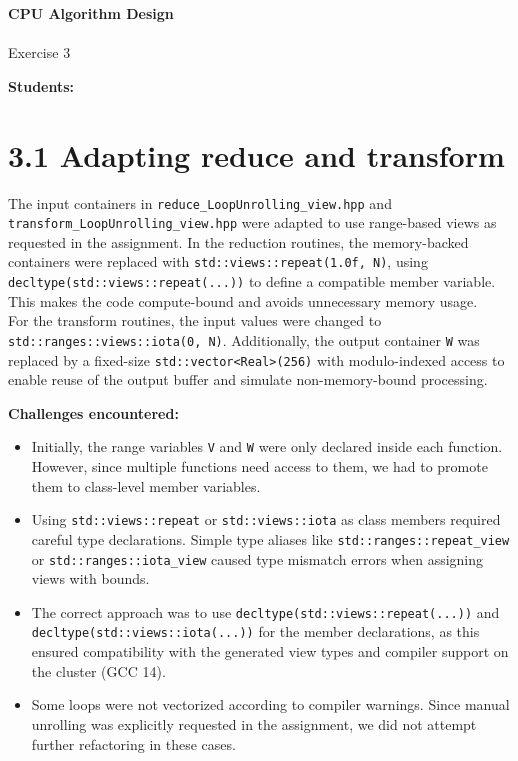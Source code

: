 





\begin{Large}
    \textsf{\textbf{CPU Algorithm Design}} \\
    \\
    Exercise 3
\end{Large}
\vspace{1ex}
\textsf{\textbf{Students:}}  \\
\vspace{2ex}

\section*{3.1 Adapting reduce and transform}

The input containers in \texttt{reduce\_LoopUnrolling\_view.hpp} and 
\\
\texttt{transform\_LoopUnrolling\_view.hpp} were adapted to use range-based views as requested in the assignment.
In the reduction routines, the memory-backed containers were replaced with \texttt{std::views::repeat(1.0f, N)}, using \texttt{decltype(std::views::repeat(...))} to define a compatible member variable. This makes the code compute-bound and avoids unnecessary memory usage.
\\
For the transform routines, the input values were changed to \texttt{std::ranges::views::iota(0, N)}. Additionally, the output container \texttt{W} was replaced by a fixed-size \texttt{std::vector<Real>(256)} with modulo-indexed access to enable reuse of the output buffer and simulate non-memory-bound processing.

\textbf{Challenges encountered:}
\begin{itemize}
    \item Initially, the range variables \texttt{V} and \texttt{W} were only declared inside each function. However, since multiple functions need access to them, we had to promote them to class-level member variables.
    \item Using \texttt{std::views::repeat} or \texttt{std::views::iota} as class members required careful type declarations. Simple type aliases like \texttt{std::ranges::repeat\_view} or \texttt{std::ranges::iota\_view} caused type mismatch errors when assigning views with bounds.
    \item The correct approach was to use \texttt{decltype(std::views::repeat(...))} and \\
    \texttt{decltype(std::views::iota(...))} for the member declarations, as this ensured compatibility with the generated view types and compiler support on the cluster (GCC 14).
    \item Some loops were not vectorized according to compiler warnings. Since manual unrolling was explicitly requested in the assignment, we did not attempt further refactoring in these cases.
\end{itemize}

